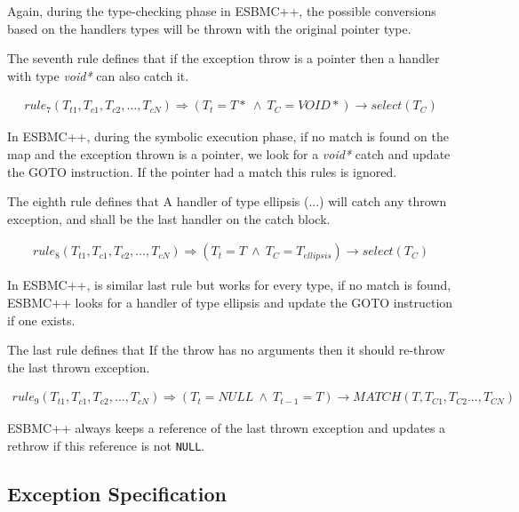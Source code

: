 \documentclass[conference]{IEEEtran}
\begin{document}
{Again, during the type-checking phase in ESBMC++, the possible conversions based
on the handlers types will be thrown with the original pointer type.

The seventh rule defines that if the exception throw is a pointer then
a handler with type \textit{void*} can also catch it.

\[\begin{array}{ll}
rule_7(T_{t1},T_{c1}, T_{c2}, \ldots, T_{cN}) \Longrightarrow
  (T_{t} = T* \: \wedge \: T_{C} = VOID*)\rightarrow select(T_{C})
\end{array}\]

In ESBMC++, during the symbolic execution phase, if no match is found on the map
and the exception thrown is a pointer, we look for a \textit{void*} catch and update
the GOTO instruction. If the pointer had a match this rules is ignored.

The eighth rule defines that A handler of type ellipsis (...) will catch
any thrown exception, and shall be the last handler on the catch block.

\[\begin{array}{ll}
rule_8(T_{t1},T_{c1}, T_{c2}, \ldots, T_{cN}) \Longrightarrow
  (T_{t} = T \: \wedge \: T_{C} = T_{ellipsis})\rightarrow select(T_{C})
\end{array}\]

In ESBMC++, is similar last rule but works for every type,
if no match is found, ESBMC++ looks for a handler of type ellipsis and
update the GOTO instruction if one exists.

The last rule defines that If the throw has no arguments then it should
re-throw the last thrown exception.

\[\begin{array}{ll}
rule_9(T_{t1},T_{c1}, T_{c2}, \ldots, T_{cN}) \Longrightarrow
  (T_{t} = NULL \: \wedge \: T_{t-1} = T)\rightarrow MATCH(T,T_{C1}, T_{C2}... , T_{CN})
\end{array}\]

ESBMC++ always keeps a reference of the last thrown exception and
updates a rethrow if this reference is not \verb|NULL|.}



\subsection{Exception Specification}
\end{document}
